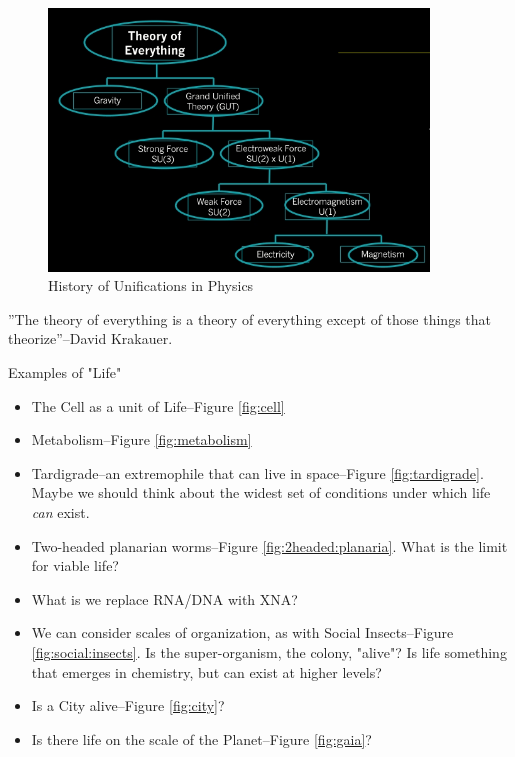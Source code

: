\documentclass[]{article}
\begin{document}
\begin{figure}[H]
	\caption{History of Unifications in Physics}
	\includegraphics[width=0.9\textwidth]{Unifications}
\end{figure}
''The theory of everything is a theory of everything except of those things that theorize''--David Krakauer.

Examples of "Life"
\begin{itemize}
	\item The Cell as a unit of Life--Figure \ref{fig:cell}
	\item Metabolism--Figure \ref{fig:metabolism}
	\item Tardigrade--an extremophile that can live in space--Figure \ref{fig:tardigrade}. Maybe we should think about the widest set of conditions under which life \textit{can} exist.
	\item Two-headed planarian worms--Figure \ref{fig:2headed:planaria}. What is the limit for viable life?\cite{levin2019planarian}
	\item What is we replace RNA/DNA with XNA?
	\item We can consider scales of organization, as with Social Insects--Figure \ref{fig:social:insects}. Is the super-organism, the colony, "alive"? Is life something that emerges in chemistry, but can exist at higher levels?\cite{pratt2015psychology}
	\item Is a City alive--Figure \ref{fig:city}?
	\item Is there life on the scale of the Planet\cite{lovelock1974atmospheric}--Figure \ref{fig:gaia}?
\end{itemize}
\end{document}

